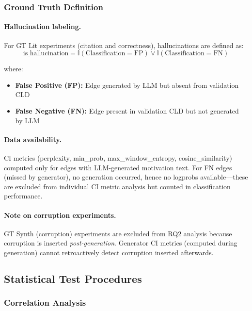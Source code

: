 \subsubsection{Ground Truth Definition}

\paragraph{Hallucination labeling.} For GT Lit experiments (citation and correctness), hallucinations are defined as:
\begin{equation}
\text{is\_hallucination} = \mathbb{I}(\text{Classification} = \text{FP}) \lor \mathbb{I}(\text{Classification} = \text{FN})
\label{eq:halluc_def}
\end{equation}

where:
\begin{itemize}
    \item \textbf{False Positive (FP):} Edge generated by LLM but absent from validation CLD
    \item \textbf{False Negative (FN):} Edge present in validation CLD but not generated by LLM
\end{itemize}

\paragraph{Data availability.} CI metrics (perplexity, min\_prob, max\_window\_entropy, cosine\_similarity) computed only for edges with LLM-generated motivation text. For FN edges (missed by generator), no generation occurred, hence no logprobs available---these are excluded from individual CI metric analysis but counted in classification performance.

\paragraph{Note on corruption experiments.} GT Synth (corruption) experiments are excluded from RQ2 analysis because corruption is inserted \textit{post-generation}. Generator CI metrics (computed during generation) cannot retroactively detect corruption inserted afterwards.

\subsection{Statistical Test Procedures}

\subsubsection{Correlation Analysis}

